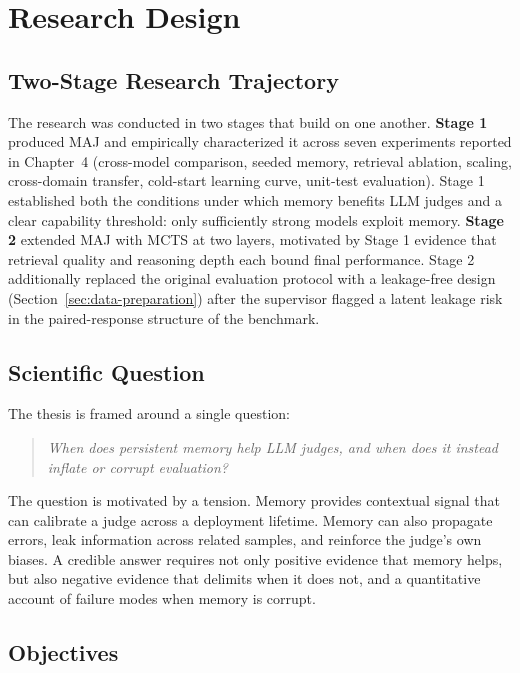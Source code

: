 \documentclass[12pt,a4paper]{report}
\begin{document}
\section{Research Design}
\label{sec:research-design}

\subsection{Two-Stage Research Trajectory}

The research was conducted in two stages that build on one another. \textbf{Stage 1} produced MAJ and empirically characterized it across seven experiments reported in Chapter~4 (cross-model comparison, seeded memory, retrieval ablation, scaling, cross-domain transfer, cold-start learning curve, unit-test evaluation). Stage 1 established both the conditions under which memory benefits LLM judges and a clear capability threshold: only sufficiently strong models exploit memory. \textbf{Stage 2} extended MAJ with MCTS at two layers, motivated by Stage 1 evidence that retrieval quality and reasoning depth each bound final performance. Stage 2 additionally replaced the original evaluation protocol with a leakage-free design (Section~\ref{sec:data-preparation}) after the supervisor flagged a latent leakage risk in the paired-response structure of the benchmark.

\subsection{Scientific Question}

The thesis is framed around a single question:

\begin{quote}
\textit{When does persistent memory help LLM judges, and when does it instead inflate or corrupt evaluation?}
\end{quote}

The question is motivated by a tension. Memory provides contextual signal that can calibrate a judge across a deployment lifetime. Memory can also propagate errors, leak information across related samples, and reinforce the judge's own biases. A credible answer requires not only positive evidence that memory helps, but also negative evidence that delimits when it does not, and a quantitative account of failure modes when memory is corrupt.

\subsection{Objectives}
\end{document}
